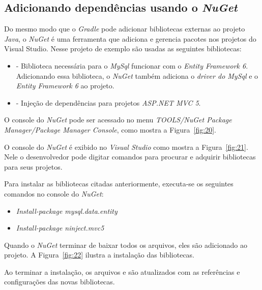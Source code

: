\subsection{Adicionando dependências usando o \textit{NuGet}}

Do mesmo modo que o \textit{Gradle} pode adicionar bibliotecas externas ao projeto \textit{Java}, o \textit{NuGet} é uma ferramenta que adiciona e gerencia pacotes nos projetos do Visual Studio. Nesse projeto de exemplo são usadas as seguintes bibliotecas:

\begin{itemize}
  \item {} - Biblioteca necessária para o \textit{MySql} funcionar com o \textit{Entity Framework 6}. Adicionando essa biblioteca, o \textit{NuGet} também adiciona o \textit{driver do MySql} e o \textit{Entity Framework 6} ao projeto.
  \item {} - Injeção de dependências para projetos \textit{ASP.NET MVC 5}. 
\end{itemize}

O console do \textit{NuGet} pode ser acessado no menu \textit{TOOLS/NuGet Package Manager/Package Manager Console}, como mostra a Figura~\ref{fig:20}.


O console do \textit{NuGet} é exibido no \textit{Visual Studio} como mostra a Figura~\ref{fig:21}. Nele o desenvolvedor pode digitar comandos para procurar e adquirir bibliotecas para seus projetos.


Para instalar as bibliotecas citadas anteriormente, executa-se os seguintes comandos no console do \textit{NuGet}:

\begin{itemize}
  \item \textit{Install-package mysql.data.entity}
  \item \textit{Install-package ninject.mvc5}
\end{itemize}

Quando o \textit{NuGet} terminar de baixar todos os arquivos, eles são adicionado ao projeto. A Figura~\ref{fig:22} ilustra a instalação das bibliotecas.


Ao terminar a instalação, os arquivos  e  são atualizados com as referências e configurações das novas bibliotecas.

